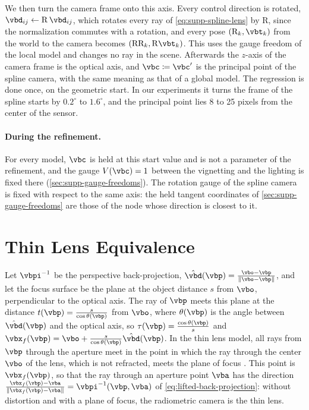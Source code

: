We then turn the camera frame onto this axis. Every control
direction is rotated, $\vbd_{ij}\leftarrow\mathrm{R}\,\vbd_{ij}$,
which rotates every ray of \cref{eq:supp-spline-lens} by
$\mathrm{R}$, since the normalization commutes with a rotation, and
every pose $(\mathrm{R}_k,\vbt_k)$ from the world to the camera
becomes $(\mathrm{R}\mathrm{R}_k,\mathrm{R}\vbt_k)$. This uses the
gauge freedom of the local model and changes no ray in the scene.
Afterwards the $z$-axis of the camera frame is the optical axis, and
$\vbc\coloneqq\vbc'$ is the principal point of the spline camera,
with the same meaning as that of a global model. The regression is
done once, on the geometric start. In our experiments it turns the
frame of the spline starts by $0.2^\circ$ to $1.6^\circ$, and the
principal point lies 8 to 25 pixels from the center of the sensor.

\paragraph{During the refinement.} For every model, $\vbc$ is held
at this start value and is not a parameter of the refinement, and
the gauge $V(\vbc)=1$ between the vignetting and the lighting is
fixed there (\cref{sec:supp-gauge-freedoms}). The rotation gauge of
the spline camera is fixed with respect to the same axis: the held
tangent coordinates of \cref{sec:supp-gauge-freedoms} are those of
the node whose direction is closest to it.


\section{Thin Lens Equivalence}
\label{sec:supp-thin-lens-equiv}
Let $\vbpi^{-1}$ be the perspective back-projection,
$\hat{\vbd}(\vbp)=\frac{\vbo-\vbp}{\lVert\vbo-\vbp\rVert}$, and let the
focus surface be the plane at the object distance $s$ from $\vbo$,
perpendicular to the optical axis. The ray of $\vbp$ meets this plane
at the distance $t(\vbp)=\frac{s}{\cos\theta(\vbp)}$ from $\vbo$, where
$\theta(\vbp)$ is the angle between $\hat{\vbd}(\vbp)$ and the optical
axis, so $\tau(\vbp)=\frac{\cos\theta(\vbp)}{s}$ and
$\vbx_f(\vbp)=\vbo+\frac{s}{\cos\theta(\vbp)}\hat{\vbd}(\vbp)$. In the
thin lens model, all rays from $\vbp$ through the aperture meet in the
point in which the ray through the center $\vbo$ of the lens, which is
not refracted, meets the plane of focus \cite{pharr2023physically}.
This point is $\vbx_f(\vbp)$, so that the ray through an aperture point
$\vba$ has the direction
$\frac{\vbx_f(\vbp)-\vba}{\lVert\vbx_f(\vbp)-\vba\rVert}=\vbpi^{-1}(\vbp,\vba)$
of \cref{eq:lifted-back-projection}: without distortion and with a
plane of focus, the radiometric camera is the thin lens.



